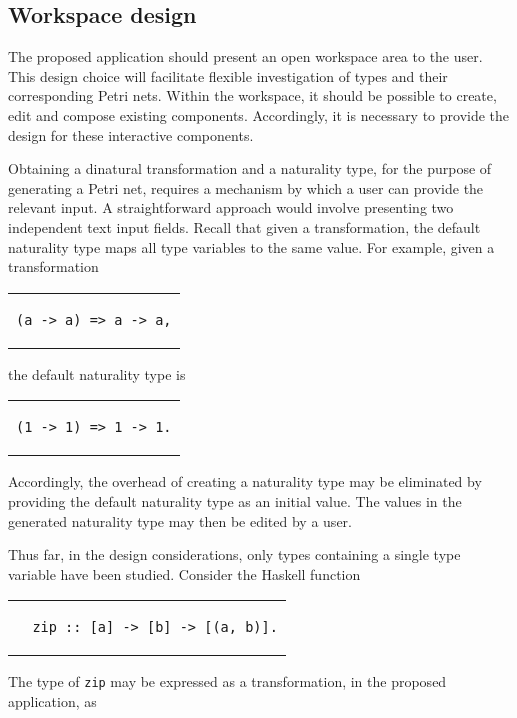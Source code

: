 \documentclass[../Dissertation.tex]{subfiles}
\begin{document}
\subsection{Workspace design}\label{sec:workspacedesign}
The proposed application should present an open workspace area to the user. This design choice will facilitate flexible investigation of types and their corresponding Petri nets. Within the workspace, it should be possible to create, edit and compose existing components. Accordingly, it is necessary to provide the design for these interactive components.
\par
Obtaining a dinatural transformation and a naturality type, for the purpose of generating a Petri net, requires a mechanism by which a user can provide the relevant input. A straightforward approach would involve presenting two independent text input fields. Recall that given a transformation, the default naturality type maps all type variables to the same value. For example, given a transformation 
\begin{center}
\begin{tabular}{c}
\begin{lstlisting}
(a -> a) => a -> a,
\end{lstlisting}
\end{tabular}
\end{center}
the default naturality type is
\begin{center}
\begin{tabular}{c}
\begin{lstlisting}
(1 -> 1) => 1 -> 1.
\end{lstlisting}
\end{tabular}
\end{center}
Accordingly, the overhead of creating a naturality type may be eliminated by providing the default naturality type as an initial value. The values in the generated naturality type may then be edited by a user.
\par
Thus far, in the design considerations, only types containing a single type variable have been studied. Consider the Haskell function
\begin{center}
\begin{tabular}{c}
\begin{lstlisting}
  zip :: [a] -> [b] -> [(a, b)].
\end{lstlisting}
\end{tabular}
\end{center}
The type of \lstinline{zip} may be expressed as a transformation, in the proposed application, as
\end{document}
